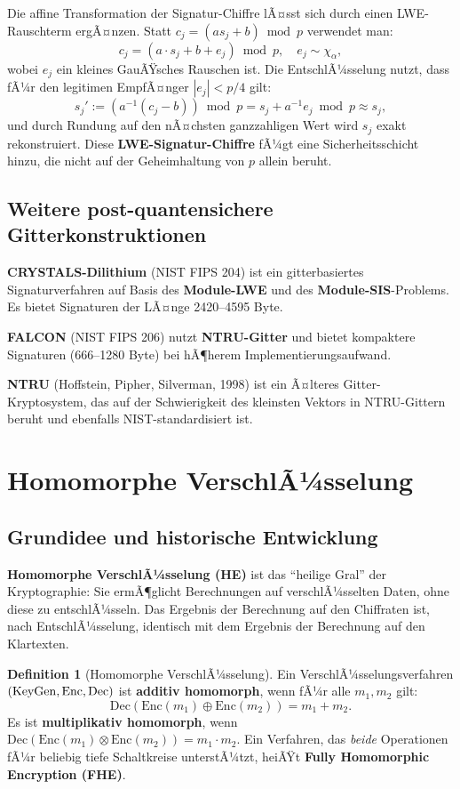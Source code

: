 ﻿\documentclass[a4paper,12pt]{scrreprt}
\theoremstyle{definition}
\newtheorem{definition}{Definition}[section]
\begin{document}
Die affine Transformation der Signatur-Chiffre lÃ¤sst sich durch einen LWE-Rauschterm ergÃ¤nzen. Statt $c_j = (a s_j + b)\bmod p$ verwendet man:
\[
c_j = (a \cdot s_j + b + e_j) \bmod p, \quad e_j \sim \chi_\alpha,
\]
wobei $e_j$ ein kleines GauÃŸsches Rauschen ist. Die EntschlÃ¼sselung nutzt, dass fÃ¼r den legitimen EmpfÃ¤nger $|e_j| < p/4$ gilt:
\[
s_j' := (a^{-1}(c_j - b))\bmod p = s_j + a^{-1}e_j \bmod p \approx s_j,
\]
und durch Rundung auf den nÃ¤chsten ganzzahligen Wert wird $s_j$ exakt rekonstruiert. Diese \textbf{LWE-Signatur-Chiffre} fÃ¼gt eine Sicherheitsschicht hinzu, die nicht auf der Geheimhaltung von $p$ allein beruht.

\subsection{Weitere post-quantensichere Gitterkonstruktionen}

\textbf{CRYSTALS-Dilithium} (NIST FIPS 204) ist ein gitterbasiertes Signaturverfahren auf Basis des \textbf{Module-LWE} und des \textbf{Module-SIS}-Problems. Es bietet Signaturen der LÃ¤nge 2420--4595 Byte.

\textbf{FALCON} (NIST FIPS 206) nutzt \textbf{NTRU-Gitter} und bietet kompaktere Signaturen (666--1280 Byte) bei hÃ¶herem Implementierungsaufwand.

\textbf{NTRU} (Hoffstein, Pipher, Silverman, 1998) ist ein Ã¤lteres Gitter-Kryptosystem, das auf der Schwierigkeit des kleinsten Vektors in NTRU-Gittern beruht und ebenfalls NIST-standardisiert ist.

\section{Homomorphe VerschlÃ¼sselung}

\subsection{Grundidee und historische Entwicklung}

\textbf{Homomorphe VerschlÃ¼sselung (HE)} ist das ``heilige Gral'' der Kryptographie: Sie ermÃ¶glicht Berechnungen auf verschlÃ¼sselten Daten, ohne diese zu entschlÃ¼sseln. Das Ergebnis der Berechnung auf den Chiffraten ist, nach EntschlÃ¼sselung, identisch mit dem Ergebnis der Berechnung auf den Klartexten.

\begin{definition}[Homomorphe VerschlÃ¼sselung]
Ein VerschlÃ¼sselungsverfahren $(\mathrm{KeyGen},  \newline \mathrm{Enc}, \mathrm{Dec})$ ist \textbf{additiv homomorph}, wenn fÃ¼r alle $m_1, m_2$ gilt:
\[
\mathrm{Dec}(\mathrm{Enc}(m_1) \oplus \mathrm{Enc}(m_2)) = m_1 + m_2.
\]
Es ist \textbf{multiplikativ homomorph}, wenn $\mathrm{Dec}(\mathrm{Enc}(m_1) \otimes \mathrm{Enc}(m_2)) = m_1 \cdot m_2$. Ein Verfahren, das \emph{beide} Operationen fÃ¼r beliebig tiefe Schaltkreise unterstÃ¼tzt, heiÃŸt \textbf{Fully Homomorphic Encryption (FHE)}.
\end{definition}
\end{document}
